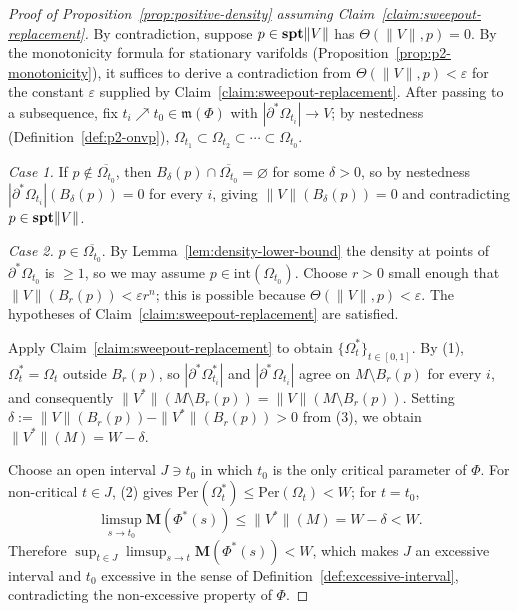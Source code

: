 \begin{proof}[Proof of Proposition~\ref{prop:positive-density} assuming Claim~\ref{claim:sweepout-replacement}]
By contradiction, suppose $p \in \mathbf{spt}\|V\|$ has $\Theta(\|V\|, p) = 0$. By the monotonicity formula for stationary varifolds (Proposition~\ref{prop:p2-monotonicity}), it suffices to derive a contradiction from $\Theta(\|V\|, p) < \varepsilon$ for the constant $\varepsilon$ supplied by Claim~\ref{claim:sweepout-replacement}. After passing to a subsequence, fix $t_i \nearrow t_0 \in \mathfrak{m}(\Phi)$ with $|\partial^*\Omega_{t_i}| \to V$; by nestedness (Definition~\ref{def:p2-onvp}), $\Omega_{t_1} \subset \Omega_{t_2} \subset \cdots \subset \Omega_{t_0}$.

\textit{Case 1.} If $p \notin \overline{\Omega_{t_0}}$, then $B_\delta(p) \cap \overline{\Omega_{t_0}} = \varnothing$ for some $\delta > 0$, so by nestedness $|\partial^*\Omega_{t_i}|(B_\delta(p)) = 0$ for every $i$, giving $\|V\|(B_\delta(p)) = 0$ and contradicting $p \in \mathbf{spt}\|V\|$.

\textit{Case 2.} $p \in \overline{\Omega_{t_0}}$. By Lemma~\ref{lem:density-lower-bound} the density at points of $\partial^*\Omega_{t_0}$ is $\ge 1$, so we may assume $p \in \mathrm{int}(\Omega_{t_0})$. Choose $r > 0$ small enough that $\|V\|(B_r(p)) < \varepsilon r^n$; this is possible because $\Theta(\|V\|, p) < \varepsilon$. The hypotheses of Claim~\ref{claim:sweepout-replacement} are satisfied.

Apply Claim~\ref{claim:sweepout-replacement} to obtain $\{\Omega^*_t\}_{t\in[0,1]}$. By (1), $\Omega^*_t = \Omega_t$ outside $B_r(p)$, so $|\partial^*\Omega^*_{t_i}|$ and $|\partial^*\Omega_{t_i}|$ agree on $M \setminus B_r(p)$ for every $i$, and consequently $\|V^*\|(M \setminus B_r(p)) = \|V\|(M \setminus B_r(p))$. Setting $\delta := \|V\|(B_r(p)) - \|V^*\|(B_r(p)) > 0$ from (3), we obtain $\|V^*\|(M) = W - \delta$.

Choose an open interval $J \ni t_0$ in which $t_0$ is the only critical parameter of $\Phi$. For non-critical $t \in J$, (2) gives $\mathrm{Per}(\Omega^*_t) \le \mathrm{Per}(\Omega_t) < W$; for $t = t_0$,
\[
    \limsup_{s \to t_0} \mathbf{M}(\Phi^*(s)) \le \|V^*\|(M) = W - \delta < W.
\]
Therefore $\sup_{t \in J} \limsup_{s \to t} \mathbf{M}(\Phi^*(s)) < W$, which makes $J$ an excessive interval and $t_0$ excessive in the sense of Definition~\ref{def:excessive-interval}, contradicting the non-excessive property of $\Phi$.
\end{proof}
